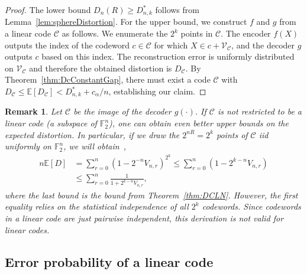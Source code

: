 \documentclass[article,doublecolumn]{IEEEtran}
\newcommand{\F}{{\mathbb{F}}}
\newcommand{\EE}{{\mathbb{E}}}
\newcommand{\CC}{{\mathcal{C}}}
\newcommand{\VC}{\mathcal{V}_{\mathcal{C}}}
\newtheorem{remark}[thm]{Remark}
\begin{document}
\begin{proof}
The lower bound $D_n(R)\geq D^*_{n,k}$ follows from Lemma~\ref{lem:sphereDistortion}. For the upper bound, we construct $f$ and $g$ from a linear code $\CC$ as follows. We enumerate the $2^k$ points in $\CC$. The encoder $f(X)$ outputs the index of the codeword $c\in\CC$ for which $X\in c+\VC$, and the decoder $g$ outputs $c$ based on this index. The reconstruction error is uniformly distributed on $\VC$ and therefore the obtained distortion is $D_\CC$. By Theorem~\ref{thm:DcConstantGap}, there must exist a code $\CC$ with $D_\CC\leq \EE[D_\CC]<D^*_{n,k}+c_\alpha/n$, establishing our claim.
\end{proof}

\begin{remark}
Let $\CC$ be the image of the decoder $g(\cdot)$. If $\CC$ is not restricted to be a linear code (a subspace of $\F_2^n$), one can obtain even better upper bounds on the expected distortion. In particular, if we draw the $2^{nR}=2^k$ points of $\CC$ iid uniformly on $\F_2^n$, we will obtain~\cite{kostina2016nonasymptotic},\cite[Ex. V3]{PWbook}
\begin{align}
n\EE[D]&= \sum_{r=0}^n \left(1-2^{-n}V_{n,r}\right)^{2^k}\leq \sum_{r=0}^n \left(1-2^{k-n}V_{n,r}\right)\\
&\leq \sum_{r=0}^n \frac{1}{1+2^{k-n}V_{n,r}},    
\end{align}
where the last bound is the bound from Theorem~\ref{thm:DCLN}. However, the first equality relies on the statistical independence of all $2^k$ codewords. Since codewords in a linear code are just pairwise independent, this derivation is not valid for linear codes.
\end{remark}
    


\subsection{Error probability of a linear code}
\end{document}
